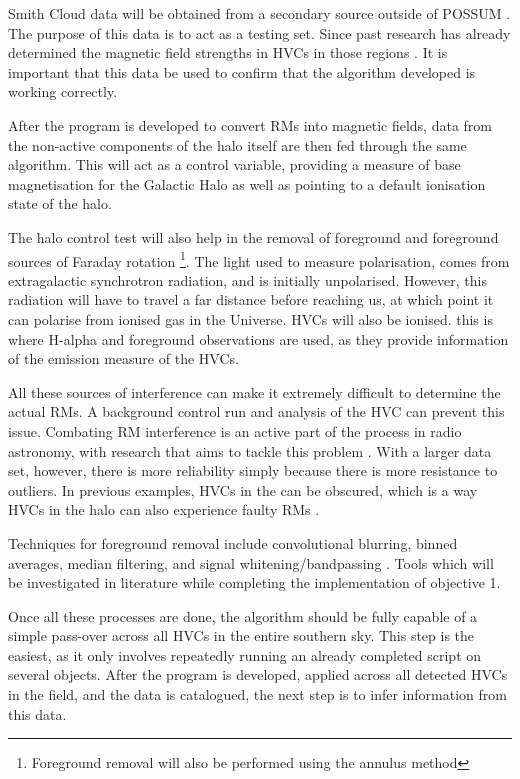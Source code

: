 Smith Cloud data will be obtained from a secondary source outside of POSSUM \cite{ID18, ID26, ID28}. The purpose of this data is to act as a testing set. Since past research has already determined the magnetic field strengths in HVCs in those regions \cite{ID26}. It is important that this data be used to confirm that the algorithm developed is working correctly.

After the program is developed to convert RMs into magnetic fields, data from the non-active components of the halo itself are then fed through the same algorithm. This will act as a control variable, providing a measure of base magnetisation for the Galactic Halo as well as pointing to a default ionisation state of the halo.

The halo control test will also help in the removal of foreground and foreground sources of Faraday rotation \footnote{Foreground removal will also be performed using the annulus method}. The light used to measure polarisation, comes from extragalactic synchrotron radiation, and is initially unpolarised. However, this radiation will have to travel a far distance before reaching us, at which point it can polarise from ionised gas in the Universe. HVCs will also be ionised. this is where H-alpha and foreground observations are used, as they provide information of the emission measure of the HVCs.

All these sources of interference can make it extremely difficult to determine the actual RMs. A background control run and analysis of the HVC can prevent this issue. Combating RM interference is an active part of the process in radio astronomy, with research that aims to tackle this problem \cite{ID21}. With a larger data set, however, there is more reliability simply because there is more resistance to outliers. In previous examples, HVCs in the can be obscured, which is a way HVCs in the halo can also experience faulty RMs \cite{ID2, ID36}.

Techniques for foreground removal include convolutional blurring, binned averages, median filtering, and signal whitening/bandpassing \cite{ID38, ID39, ID40}. Tools which will be investigated in literature while completing the implementation of objective 1.

Once all these processes are done, the algorithm should be fully capable of a simple pass-over across all HVCs in the entire southern sky. This step is the easiest, as it only involves repeatedly running an already completed script on several objects. After the program is developed, applied across all detected HVCs in the field, and the data is catalogued, the next step is to infer information from this data.

